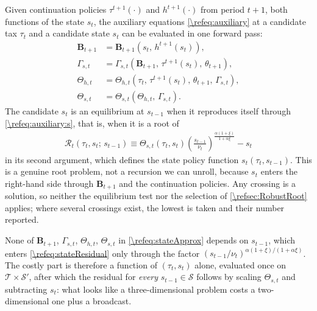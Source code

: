 Given continuation policies $\tau^{t+1}(\cdot)$ and $h^{t+1}(\cdot)$ from period $t+1$, both functions of the state $s_t$, the auxiliary equations \eqref{\refeq:auxiliary} at a candidate tax $\tau_t$ and a candidate state $s_t$ can be evaluated in one forward pass:
\begin{subequations}\label{\refeq:stateApprox}
\begin{align}
    \bm{B}_{t+1} &= \bm{B}_{t+1}\left(s_t,\, h^{t+1}(s_t)\right), \label{\refeq:stateApprox:B}\\
    \Gamma_{s,t} &= \Gamma_{s,t}\left(\bm{B}_{t+1},\, \tau^{t+1}(s_t),\, \theta_{t+1}\right), \label{\refeq:stateApprox:Gammas}\\
    \Theta_{h,t} &= \Theta_{h,t}\left(\tau_t,\, \tau^{t+1}(s_t),\, \theta_{t+1},\, \Gamma_{s,t}\right), \label{\refeq:stateApprox:Thetah}\\
    \Theta_{s,t} &= \Theta_{s,t}\left(\Theta_{h,t},\, \Gamma_{s,t}\right). \label{\refeq:stateApprox:Thetas}
\end{align}
\end{subequations}
The candidate $s_t$ is an equilibrium at $s_{t-1}$ when it reproduces itself through \eqref{\refeq:auxiliary:s}, that is, when it is a root of
\begin{align}\label{\refeq:stateResidual}
    \mathcal{R}_t\left(\tau_t, s_t;\, s_{t-1}\right) \equiv \Theta_{s,t}\left(\tau_t, s_t\right)\left(\frac{s_{t-1}}{\nu_t}\right)^{\frac{\alpha(1+\xi)}{1+\alpha\xi}}-s_t
\end{align}
in its second argument, which defines the state policy function $s_t(\tau_t, s_{t-1})$. This is a genuine root problem, not a recursion we can unroll, because $s_t$ enters the right-hand side through $\bm{B}_{t+1}$ and the continuation policies. Any crossing is a solution, so neither the equilibrium test nor the selection of \cref{\refsec:RobustRoot} applies; where several crossings exist, the lowest is taken and their number reported.

None of $\bm{B}_{t+1}$, $\Gamma_{s,t}$, $\Theta_{h,t}$, $\Theta_{s,t}$ in \eqref{\refeq:stateApprox} depends on $s_{t-1}$, which enters \eqref{\refeq:stateResidual} only through the factor $(s_{t-1}/\nu_t)^{\alpha(1+\xi)/(1+\alpha\xi)}$. The costly part is therefore a function of $(\tau_t, s_t)$ alone, evaluated once on $\mathcal{T}\times\mathcal{S}'$, after which the residual for \emph{every} $s_{t-1}\in\mathcal{S}$ follows by scaling $\Theta_{s,t}$ and subtracting $s_t$: what looks like a three-dimensional problem costs a two-dimensional one plus a broadcast.

